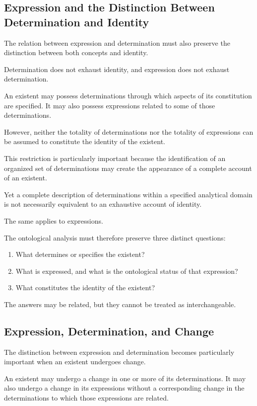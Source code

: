 \subsection{Expression and the Distinction Between Determination and Identity}

The relation between expression and determination
must also preserve the distinction between both
concepts and identity.

Determination does not exhaust identity, and
expression does not exhaust determination.

An existent may possess determinations through
which aspects of its constitution are specified.
It may also possess expressions related to some
of those determinations.

However, neither the totality of determinations
nor the totality of expressions can be assumed
to constitute the identity of the existent.

This restriction is particularly important because
the identification of an organized set of determinations
may create the appearance of a complete account
of an existent.

Yet a complete description of determinations
within a specified analytical domain is not
necessarily equivalent to an exhaustive account
of identity.

The same applies to expressions.

The ontological analysis must therefore preserve
three distinct questions:

\begin{enumerate}
    \item What determines or specifies the existent?
    \item What is expressed, and what is the ontological
    status of that expression?
    \item What constitutes the identity of the existent?
\end{enumerate}

The answers may be related, but they cannot be
treated as interchangeable.

\subsection{Expression, Determination, and Change}

The distinction between expression and determination
becomes particularly important when an existent
undergoes change.

An existent may undergo a change in one or more
of its determinations. It may also undergo a change
in its expressions without a corresponding change
in the determinations to which those expressions
are related.

